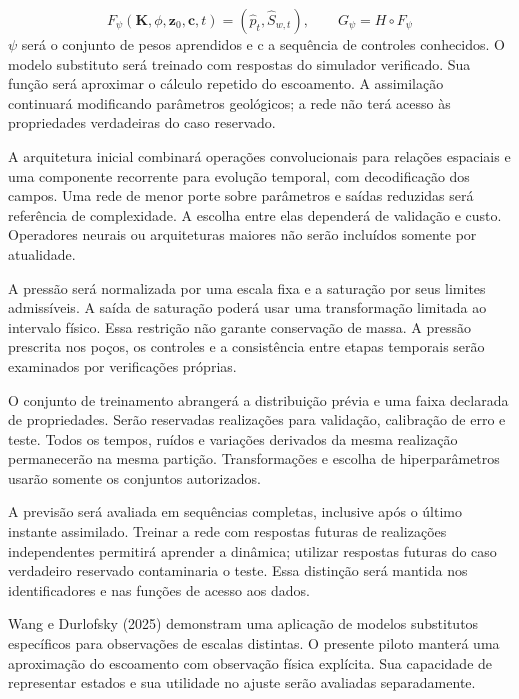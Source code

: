 \documentclass[12pt,a4paper]{article}
\begin{document}
\begin{equation}
F_\psi(\mathbf K,\phi,\mathbf z_0,\mathbf c,t)=(\widehat p_t,\widehat S_{w,t}),\qquad G_\psi=H\circ F_\psi
\end{equation}
\(\psi\) será o conjunto de pesos aprendidos e c a sequência de controles conhecidos. O modelo substituto será treinado com respostas do simulador verificado. Sua função será aproximar o cálculo repetido do escoamento. A assimilação continuará modificando parâmetros geológicos; a rede não terá acesso às propriedades verdadeiras do caso reservado.\par
A arquitetura inicial combinará operações convolucionais para relações espaciais e uma componente recorrente para evolução temporal, com decodificação dos campos. Uma rede de menor porte sobre parâmetros e saídas reduzidas será referência de complexidade. A escolha entre elas dependerá de validação e custo. Operadores neurais ou arquiteturas maiores não serão incluídos somente por atualidade.\par
A pressão será normalizada por uma escala fixa e a saturação por seus limites admissíveis. A saída de saturação poderá usar uma transformação limitada ao intervalo físico. Essa restrição não garante conservação de massa. A pressão prescrita nos poços, os controles e a consistência entre etapas temporais serão examinados por verificações próprias.\par
O conjunto de treinamento abrangerá a distribuição prévia e uma faixa declarada de propriedades. Serão reservadas realizações para validação, calibração de erro e teste. Todos os tempos, ruídos e variações derivados da mesma realização permanecerão na mesma partição. Transformações e escolha de hiperparâmetros usarão somente os conjuntos autorizados.\par
A previsão será avaliada em sequências completas, inclusive após o último instante assimilado. Treinar a rede com respostas futuras de realizações independentes permitirá aprender a dinâmica; utilizar respostas futuras do caso verdadeiro reservado contaminaria o teste. Essa distinção será mantida nos identificadores e nas funções de acesso aos dados.\par
Wang e Durlofsky (2025) demonstram uma aplicação de modelos substitutos específicos para observações de escalas distintas. O presente piloto manterá uma aproximação do escoamento com observação física explícita. Sua capacidade de representar estados e sua utilidade no ajuste serão avaliadas separadamente.\par
\end{document}
